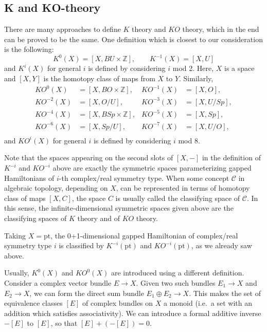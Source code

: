 \documentclass[12pt]{article}
\numberwithin{equation}{section}
\numberwithin{figure}{section}
\theoremstyle{remark}
\def\bZ{\mathbb{Z}}
\def\pt{\mathrm{pt}}
\begin{document}
\subsection{K and KO-theory}
There are many approaches to define $K$ theory and $KO$ theory,
which in the end can be proved to be the same. 
One definition which is closest to our consideration is the following: 
\begin{equation}
K^0(X) = [X, BU\times \bZ],\qquad K^{-1}(X)=[X, U]
\label{Kclass}
\end{equation}  and $K^i(X)$ for general $i$ is defined by considering $i$ mod 2.
Here, $X$ is a space and $[X,Y]$ is the homotopy class of maps from $X$ to $Y$.
Similarly, \begin{equation}
\begin{aligned}
KO^0(X)&=[X,BO\times \bZ], &
KO^{-1}(X)&=[X,O], \\
KO^{-2}(X)&=[X,O/U],&
KO^{-3}(X)&=[X,U/Sp],\\
KO^{-4}(X)&=[X,BSp\times \bZ], &
KO^{-5}(X)&=[X,Sp], \\
KO^{-6}(X)&=[X,Sp/U],&
KO^{-7}(X)&=[X,U/O],\\
\end{aligned}
\label{KOclass}
\end{equation} and $KO^i(X)$ for general $i$ is defined by considering $i$ mod 8.

Note that the spaces appearing on the second slots of $[X,-]$ in the definition of $K^{-i}$ 
and $KO^{-i}$ above  are exactly the symmetric spaces parameterizing gapped Hamiltonians
of $i$-th complex/real symmetry type.
When some concept $\mathcal{C}$ in algebraic topology, depending on $X$,
can be represented in terms of homotopy class of maps $[X,C]$,
the space $C$ is usually called the classifying space of $\mathcal{C}$.
In this sense, the infinite-dimensional symmetric spaces given above are the classifying spaces of $K$ theory
and of $KO$ theory.

Taking $X=\pt$, 
the 0+1-dimensional gapped Hamiltonian of complex/real symmetry type $i$ is classified by 
$K^{-i}(\pt)$ and $KO^{-i}(\pt)$, as we already saw above.

Usually, $K^0(X)$ and $KO^0(X)$ are introduced using a different definition.
Consider a complex vector bundle $E\to X$.
Given two such bundles $E_1\to X$ and $E_2\to X$, we can form the direct sum bundle $E_1\oplus E_2\to X$.
This makes the set of equivalence classes $[E]$ of complex bundles on $X$ a monoid (i.e.~a set with an addition
which satisfies associativity).
We can introduce a formal additive inverse $-[E]$ to $[E]$, so that $[E]+ (-[E])=0$.
\end{document}
